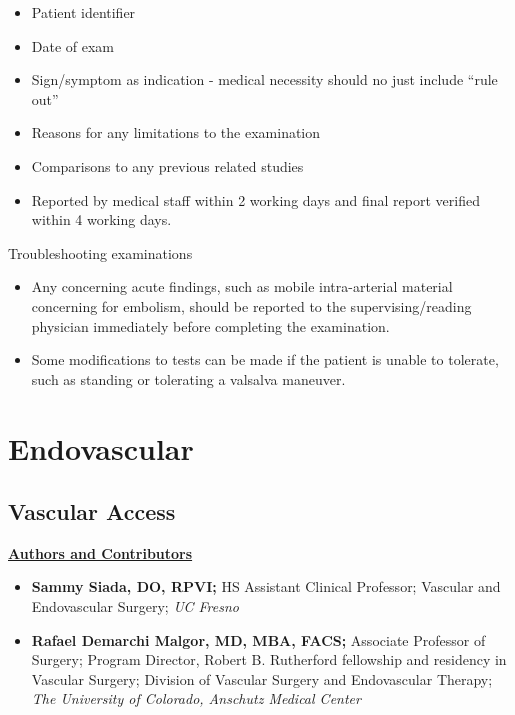 \documentclass[
]{book}
\begin{document}
\begin{itemize}
\item
  Patient identifier
\item
  Date of exam
\item
  Sign/symptom as indication - medical necessity should no just
  include ``rule out''
\item
  Reasons for any limitations to the examination
\item
  Comparisons to any previous related studies
\item
  Reported by medical staff within 2 working days and final report
  verified within 4 working days.
\end{itemize}

Troubleshooting examinations

\begin{itemize}
\item
  Any concerning acute findings, such as mobile intra-arterial
  material concerning for embolism, should be reported to the
  supervising/reading physician immediately before completing the
  examination.\citep{societyofdiagnosticmedicalsonography2015}
\item
  Some modifications to tests can be made if the patient is unable to
  tolerate, such as standing or tolerating a valsalva
  maneuver.\citep{societyofdiagnosticmedicalsonography2015}
\end{itemize}

\hypertarget{endovascular-2}{%
\chapter{Endovascular}\label{endovascular-2}}

\hypertarget{vascular-access}{%
\section{Vascular Access}\label{vascular-access}}

\uline{\textbf{Authors and Contributors}}

\begin{itemize}
\item
  \textbf{Sammy Siada, DO, RPVI;} HS Assistant Clinical Professor; Vascular
  and Endovascular Surgery; \emph{UC Fresno}
\item
  \textbf{Rafael Demarchi Malgor, MD, MBA, FACS;} Associate Professor of
  Surgery; Program Director, Robert B. Rutherford fellowship and
  residency in Vascular Surgery; Division of Vascular Surgery and
  Endovascular Therapy; \emph{The University of Colorado, Anschutz Medical
  Center}
\end{itemize}
\end{document}
